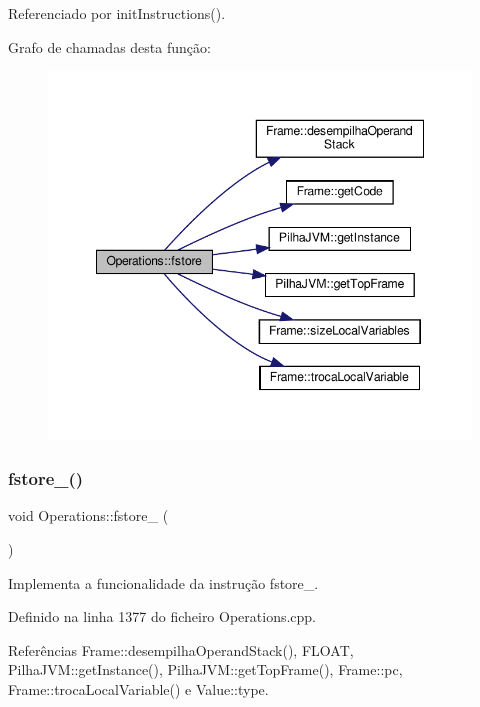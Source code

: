 Referenciado por init\+Instructions().

Grafo de chamadas desta função\+:\nopagebreak
\begin{figure}[H]
\begin{center}
\leavevmode
\includegraphics[width=348pt]{classOperations_a42a0b3220b593059320cf7d5a5eed6e2_cgraph}
\end{center}
\end{figure}
\mbox{\label{classOperations_a7465534bbf4e4ca9f0493a8dbe645d46}} 
\subsubsection{\texorpdfstring{fstore\+\_()}{fstore\_0()}}
{\footnotesize\ttfamily void Operations\+::fstore\+\_ (\begin{DoxyParamCaption}{ }\end{DoxyParamCaption})\hspace{0.3cm}{\ttfamily [private]}}



Implementa a funcionalidade da instrução fstore\+\_. 



Definido na linha 1377 do ficheiro Operations.\+cpp.



Referências Frame\+::desempilha\+Operand\+Stack(), F\+L\+O\+AT, Pilha\+J\+V\+M\+::get\+Instance(), Pilha\+J\+V\+M\+::get\+Top\+Frame(), Frame\+::pc, Frame\+::troca\+Local\+Variable() e Value\+::type.



